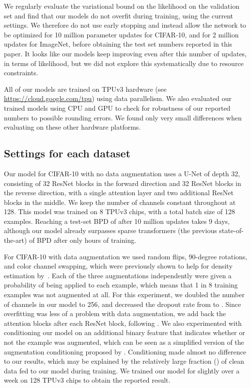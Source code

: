 \documentclass{article}
\begin{document}
We regularly evaluate the variational bound on the likelihood on the validation set and find that our models do not overfit during training, using the current settings. We therefore do not use early stopping and instead allow the network to be optimized for 10 million parameter updates for CIFAR-10, and for 2 million updates for ImageNet, before obtaining the test set numbers reported in this paper. It looks like our models keep improving even after this number of updates, in terms of likelihood, but we did not explore this systematically due to resource constraints.

All of our models are trained on TPUv3 hardware (see \url{https://cloud.google.com/tpu}) using data parallelism. We also evaluated our trained models using CPU and GPU to check for robustness of our reported numbers to possible rounding errors. We found only very small differences when evaluating on these other hardware platforms.

\subsection{Settings for each dataset}
\label{app:exp_settings}
Our model for CIFAR-10 with no data augmentation uses a U-Net of depth 32, consisting of 32 ResNet blocks in the forward direction and 32 ResNet blocks in the reverse direction, with a single attention layer and two additional ResNet blocks in the middle. We keep the number of channels constant throughout at 128. This model was trained on 8 TPUv3 chips, with a total batch size of 128 examples. Reaching a test-set BPD of  after 10 million updates takes 9 days, although our model already surpasses sparse transformers (the previous state-of-the-art) of  BPD after only  hours of training.

For CIFAR-10 with data augmentation we used random flips, 90-degree rotations, and color channel swapping, which were previously shown to help for density estimation by~\cite{jun2020distribution}. Each of the three augmentations independently were given a  probability of being applied to each example, which means that 1 in 8 training examples was not augmented at all. For this experiment, we doubled the number of channels in our model to 256, and decreased the dropout rate from  to . Since overfitting was less of a problem with data augmentation, we add back the attention blocks after each ResNet block, following \cite{ho2020denoising}. We also experimented with conditioning our model on an additional binary feature that indicates whether or not the example was augmented, which can be seen as a simplified version of the augmentation conditioning proposed by \cite{jun2020distribution}. Conditioning made almost no difference to our results, which may be explained by the relatively large fraction () of clean data fed to our model during training. We trained our model for slightly over a week on 128 TPUv3 chips to obtain the reported result.
\end{document}
